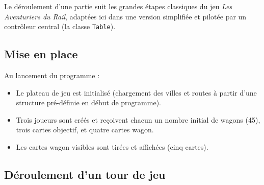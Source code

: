 \documentclass[a4paper,12pt]{report}
\begin{document}
Le déroulement d'une partie suit les grandes étapes classiques du jeu \textit{Les Aventuriers du Rail},
adaptées ici dans une version simplifiée et pilotée par un contrôleur central (la classe \texttt{Table}).

\subsection*{Mise en place}

Au lancement du programme :
\begin{itemize}
    \item Le plateau de jeu est initialisé (chargement des villes et routes à partir d'une structure pré-définie en début de programme).
    \item Trois joueurs sont créés et reçoivent chacun un nombre initial de wagons (45), trois cartes objectif, et quatre cartes wagon.
    \item Les cartes wagon visibles sont tirées et affichées (cinq cartes).
\end{itemize}

\subsection*{Déroulement d’un tour de jeu}
\end{document}
